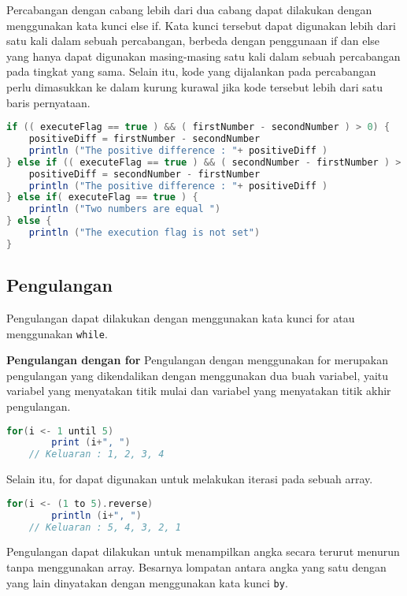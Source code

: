 Percabangan dengan cabang lebih dari dua cabang dapat dilakukan dengan menggunakan kata
kunci else if. Kata kunci tersebut dapat digunakan lebih dari satu kali dalam sebuah percabangan,
berbeda dengan penggunaan if dan else yang hanya dapat digunakan masing-masing satu kali
dalam sebuah percabangan pada tingkat yang sama. Selain itu, kode yang dijalankan pada
percabangan perlu dimasukkan ke dalam kurung kurawal jika kode tersebut lebih dari satu baris
pernyataan.

\begin{lstlisting}[showstringspaces=false, language=Scala, caption= Penggunaan else if dalam percabangan]
if (( executeFlag == true ) && ( firstNumber - secondNumber ) > 0) {
	positiveDiff = firstNumber - secondNumber
	println ("The positive difference : "+ positiveDiff )
} else if (( executeFlag == true ) && ( secondNumber - firstNumber ) > 0){
	positiveDiff = secondNumber - firstNumber
	println ("The positive difference : "+ positiveDiff )
} else if( executeFlag == true ) {
	println ("Two numbers are equal ")
} else {
	println ("The execution flag is not set")
}
\end{lstlisting}

\subsection{Pengulangan}
Pengulangan dapat dilakukan dengan menggunakan kata kunci for atau menggunakan \texttt{while}.

\textbf{Pengulangan dengan for}\newline
Pengulangan dengan menggunakan for merupakan pengulangan yang dikendalikan dengan menggunakan
dua buah variabel, yaitu variabel yang menyatakan titik mulai dan variabel yang menyatakan
titik akhir pengulangan.

\begin{lstlisting}[showstringspaces=false, language=Scala, caption= Contoh dasar penggunaan for]
	for(i <- 1 until 5)
		print (i+", ")
	// Keluaran : 1, 2, 3, 4
\end{lstlisting}

Selain itu, for dapat digunakan untuk melakukan iterasi pada sebuah array.

\begin{lstlisting}[showstringspaces=false, language=Scala, caption= Iterasi pada array]
	for(i <- (1 to 5).reverse)
		println (i+", ")
	// Keluaran : 5, 4, 3, 2, 1
\end{lstlisting}

Pengulangan dapat dilakukan untuk menampilkan angka secara terurut menurun tanpa menggunakan
array. Besarnya lompatan antara angka yang satu dengan yang lain dinyatakan dengan
menggunakan kata kunci \texttt{by}.

